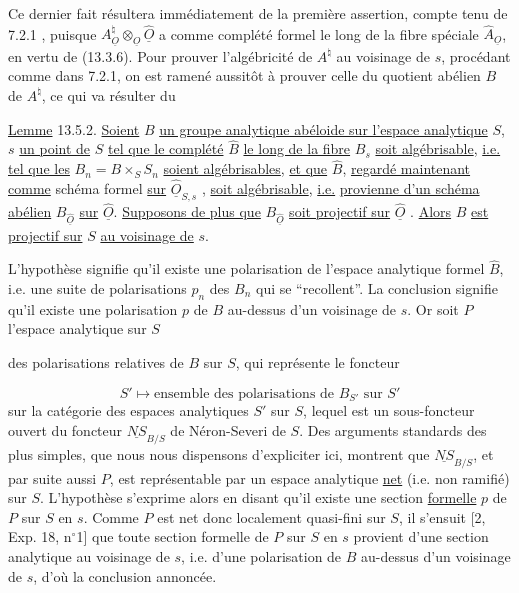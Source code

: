 Ce dernier fait résultera immédiatement de la première assertion, compte tenu de 7.2.1 , puisque $A^\natural_{\underline{O}} \otimes_{\underline{O}} \hat{\underline{O}}$ a comme complété formel le long de la fibre spéciale $\hat{A}_{\underline{O}}$, en vertu de (13.3.6). Pour prouver l'algébricité de $A^\natural$ au voisinage de $s$, procédant comme dans 7.2.1, on est ramené aussitôt à prouver celle du quotient abélien $B$ de $A^\natural$, ce qui va résulter du

\underline{Lemme} 13.5.2. \underline{Soient} $B$ \underline{un groupe analytique abéloide sur l'espace analytique} $S$, $s$ \underline{un point de} $S$ \underline{tel que le complété} $\hat{B}$ \underline{le long de la fibre} $B_s$ \underline{soit algébrisable}, \underline{i.e.} \underline{tel que les} $B_n = B \times_S S_n$ \underline{soient algébrisables}, \underline{et que} $\hat{B}$, \underline{regardé maintenant comme} schéma formel \underline{sur} $\hat{\underline{O}}_{S,s}$ , \underline{soit algébrisable}, \underline{i.e.} \underline{provienne d'un schéma abélien} $B_{\hat{\underline{O}}}$ \underline{sur} $\hat{\underline{O}}$. \underline{Supposons de plus que} $B_{\hat{\underline{O}}}$ \underline{soit projectif sur} $\hat{\underline{O}}$ . \underline{Alors} $B$ \underline{est projectif sur} $S$ \underline{au voisinage de} $s$.

L'hypothèse signifie qu'il existe une polarisation de l'espace analytique formel $\hat{B}$, i.e. une suite de polarisations $p_n$ des $B_n$ qui se ``recollent''. La conclusion signifie qu'il existe une polarisation $p$ de $B$ au-dessus d'un voisinage de $s$. Or soit $P$ l'espace analytique sur $S$



des polarisations relatives de $B$ sur $S$, qui représente le foncteur

\begin{equation*}
S' \longmapsto \text{ensemble des polarisations de } B_{S'} \text{ sur } S'
\end{equation*}
sur la catégorie des espaces analytiques $S'$ sur $S$, lequel est un sous-foncteur ouvert du foncteur $\underline{NS}_{B/S}$ de Néron-Severi de $S$. Des arguments standards des plus simples, que nous nous dispensons d'expliciter ici, montrent que $\underline{NS}_{B/S}$, et par suite aussi $P$, est représentable par un espace analytique \underline{net} (i.e. non ramifié) sur $S$. L'hypothèse s'exprime alors en disant qu'il existe une section \underline{formelle} $p$ de $P$ sur $S$ en $s$. Comme $P$ est net donc localement quasi-fini sur $S$, il s'ensuit [2, Exp. 18, n$^{\circ}$1] que toute section formelle de $P$ sur $S$ en $s$ provient d'une section analytique au voisinage de $s$, i.e. d'une polarisation de $B$ au-dessus d'un voisinage de $s$, d'où la conclusion annoncée.

